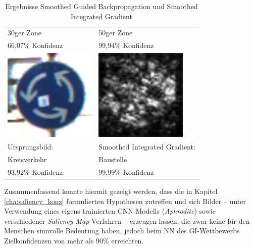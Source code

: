 \begin{table}
\begin{tabular}{p{}p{7cm}}
		30ger Zone & 50ger Zone\\
		66,07\% Konfidenz & 99,94\% Konfidenz\\
		\includegraphics[height=4.4cm]{Images/AnPe/5_2_Unten_links} &\includegraphics[height=4.4cm]{Images/AnPe/5_2_Unten_rechts}  \\
		Ursprungsbild: & Smoothed Integrated Gradient:\\
		Kreisverkehr & Baustelle\\
		93,92\% Konfidenz & 99,99\% Konfidenz\\
	\end{tabular}
	\caption{Ergebnisse Smoothed Guided Backpropagation und Smoothed Integrated Gradient}
\label{tab:sal2}
\end{table}

Zusammenfassend konnte hiermit gezeigt werden, dass die in Kapitel \ref{cha:saliency_konz} formulierten Hypothesen zutreffen und sich Bilder – unter Verwendung eines eigens trainierten \ac{CNN} Modells (\textit{Aphrodite}) sowie verschiedener \textit{Saliency Map} Verfahren – erzeugen lassen, die zwar keine für den Menschen sinnvolle Bedeutung haben, jedoch beim \ac{NN} des \ac{GI}-Wettbewerbs Zielkonfidenzen von mehr als 90\% erreichten.
